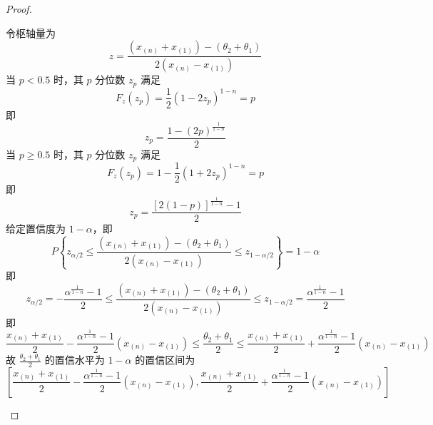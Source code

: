 \documentclass[normal,founder,mtpro2,cn]{elegantnote}
\begin{document}
\begin{enumerate}
\begin{proof}
\begin{enumerate}
                      令枢轴量为
                      \begin{equation*}
                          z=\frac{\left(x_{(n)}+x_{(1)}\right)-\left(\theta_{2}+\theta_{1}\right)}{2\left(x_{(n)}-x_{(1)}\right)}
                      \end{equation*}
                      当 $p<0.5$ 时，其 $p$ 分位数 $z_{p}$ 满足
                      \begin{equation*}
                          F_{z}\left(z_{p}\right)=\frac{1}{2}\left(1-2z_{p}\right)^{1-n}=p
                      \end{equation*}
                      即
                      \begin{equation*}
                          z_{p}=\frac{1-(2p)^{\frac{1}{1-n}}}{2}
                      \end{equation*}
                      当 $p\geq 0.5$ 时，其 $p$ 分位数 $z_{p}$ 满足
                      \begin{equation*}
                          F_{z}\left(z_{p}\right)=1-\frac{1}{2}\left(1+2z_{p}\right)^{1-n}=p
                      \end{equation*}
                      即
                      \begin{equation*}
                          z_{p}=\frac{[2(1-p)]^{\frac{1}{1-n}}-1}{2}
                      \end{equation*}
                      给定置信度为 $1-\alpha$，即
                      \begin{equation*}
                          P\left\{z_{\alpha/2}\leq\frac{\left(x_{(n)}+x_{(1)}\right)-\left(\theta_{2}+\theta_{1}\right)}{2\left(x_{(n)}-x_{(1)}\right)}\leq z_{1-\alpha/2}\right\}=1-\alpha
                      \end{equation*}
                      即
                      \begin{equation*}
                          z_{\alpha/2}=-\frac{\alpha^{\frac{1}{1-n}}-1}{2}\leq\frac{\left(x_{(n)}+x_{(1)}\right)-\left(\theta_{2}+\theta_{1}\right)}{2\left(x_{(n)}-x_{(1)}\right)}\leq z_{1-\alpha/2}=\frac{\alpha^{\frac{1}{1-n}}-1}{2}
                      \end{equation*}
                      即
                      \begin{equation*}
                          \frac{x_{(n)}+x_{(1)}}{2}-\frac{\alpha^{\frac{1}{1-n}}-1}{2}\left(x_{(n)}-x_{(1)}\right)\leq\frac{\theta_{2}+\theta_{1}}{2}\leq\frac{x_{(n)}+x_{(1)}}{2}+\frac{\alpha^{\frac{1}{1-n}}-1}{2}\left(x_{(n)}-x_{(1)}\right)
                      \end{equation*}
                      故 $\frac{\theta_{2}+\theta_{1}}{2}$ 的置信水平为 $1-\alpha$ 的置信区间为
                      \begin{equation*}
                          \left[\frac{x_{(n)}+x_{(1)}}{2}-\frac{\alpha^{\frac{1}{1-n}}-1}{2}\left(x_{(n)}-x_{(1)}\right),\frac{x_{(n)}+x_{(1)}}{2}+\frac{\alpha^{\frac{1}{1-n}}-1}{2}\left(x_{(n)}-x_{(1)}\right)\right]
                      \end{equation*}
            \end{enumerate}
        \end{proof}
\end{enumerate}
\end{document}
